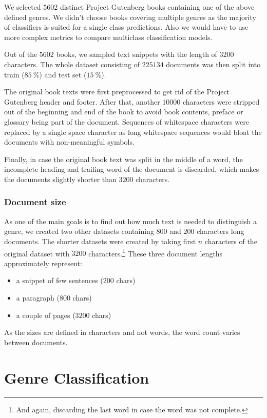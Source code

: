 We selected $5602$ distinct Project Gutenberg books containing one of the above defined genres. We didn't choose books covering multiple genres as the majority of classifiers is suited for a single class predictions. Also we would have to use more complex metrics to compare multiclass classification models.

Out of the $5602$ books, we sampled text snippets with the length of $3200$ characters. The whole dataset consisting of $225134$ documents was then split into train ($85\ \%$) and test set ($15\ \%$).

The original book texts were first preprocessed to get rid of the Project Gutenberg header and footer. After that, another $10000$ characters were stripped out of the beginning and end of the book to avoid book contents, preface or glossary being part of the document. Sequences of whitespace characters were replaced by a single space character as long whitespace sequences would bloat the documents with non-meaningful symbols.

Finally, in case the original book text was split in the middle of a word, the incomplete heading and trailing word of the document is discarded, which makes the documents slightly shorter than $3200$ characters.


\subsubsection{Document size}
As one of the main goals is to find out how much text is needed to distinguish a genre, we created two other datasets containing $800$ and $200$ characters long documents. The shorter datasets were created by taking first $n$ characters of the original dataset with $3200$ characters.\footnote{And again, discarding the last word in case the word was not complete.} These three document lengths approximately represent:
\begin{itemize}
  \item a snippet of few sentences ($200$ chars)
  \item a paragraph ($800$ chars)
  \item a couple of pages ($3200$ chars)
\end{itemize}
As the sizes are defined in characters and not words, the word count varies between documents.


\section{Genre Classification}

